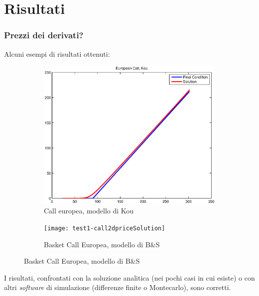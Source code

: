 \documentclass{beamer}
\begin{document}
\section{Risultati}


\begin{frame}
 \frametitle{Prezzi dei derivati?}
Alcuni esempi di risultati ottenuti: 
\begin{figure}
 \begin{subfigure}{0.48\linewidth}
 \centering
 \includegraphics[width=.9\linewidth]{test2-call1dkou}
 \caption{Call europea, modello di Kou}
 \end{subfigure}
 \hfill
 \begin{subfigure}{0.48\linewidth}
  \centering
  \texttt{[image: test1-call2dpriceSolution]}
  \caption{Basket Call Europea, modello di B\&S }
 \end{subfigure}
 \end{figure}
I risultati, confrontati con la soluzione analitica (nei pochi casi in cui esiste)  o con altri \emph{software} di simulazione (differenze finite o Montecarlo), sono corretti.
\end{frame}
\end{document}

